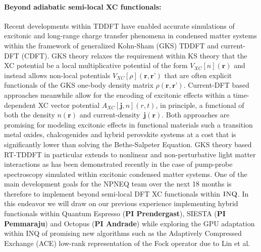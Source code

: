 \paragraph{Beyond adiabatic semi-local XC functionals:}  Recent developments within TDDFT have enabled accurate simulations of excitonic and long-range charge transfer phenomena in condensed matter systems within the framework of generalized Kohn-Sham (GKS) TDDFT and current-DFT (CDFT).  GKS theory relaxes the requirement within KS theory that the XC potential be a local multiplicative potential of the form $V_{XC}[n](\textbf{r})$ and instead allows non-local potentials $V_{XC}[\rho](\textbf{r},\textbf{r'} )$ that are often explicit functionals of the GKS one-body density matrix $\rho(\textbf{r},\textbf{r'})$. Current-DFT  based approaches meanwhile allow for the  encoding of excitonic effects within a time-dependent XC vector potential $A_{XC}[\textbf{j},n](r,t)$, in principle, a functional of both the density $n(\textbf{r})$ and current-density~$\textbf{j}(\textbf{r})$. Both approaches are promising for  modeling excitonic effects in  functional materials such a transition metal oxides, chalcogenides and hybrid perovskite systems at a cost that is significantly lower than solving the Bethe-Salpeter Equation. GKS theory based RT-TDDFT in particular extends to nonlinear and non-perturbative light matter interactions as has been demonstrated recently in the case of pump-probe spectroscopy simulated within excitonic condensed matter systems. One of the main development goals for the NPNEQ team over the next 18 months is therefore to implement beyond semi-local DFT XC functionals within $\textsc{INQ}$.  In this endeavor we will draw on our previous experience implementing hybrid functionals within Quantum Espresso (\textbf{PI Prendergast}), SIESTA (\textbf{PI Pemmaraju}) and Octopus (\textbf{PI Andrade}) while exploring the GPU adaptation within \textsc{INQ} of promising new algorithms such as the  Adaptively Compressed Exchange (ACE) low-rank representation of the Fock operator due to Lin et al.   

